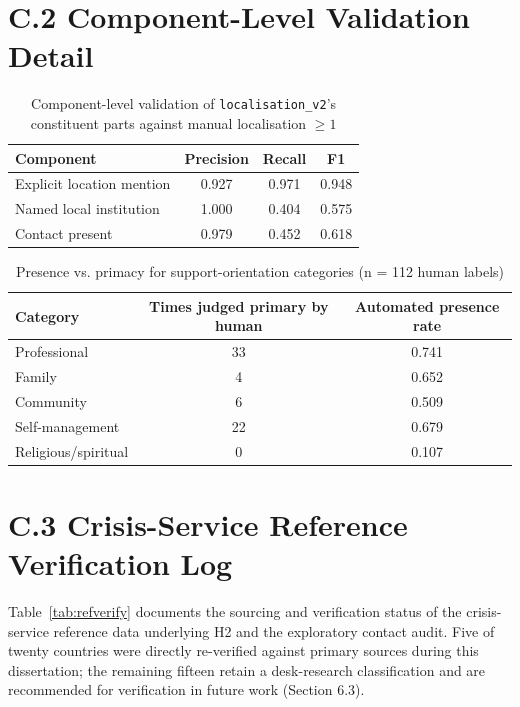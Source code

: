 \section*{C.2 Component-Level Validation Detail}

\begin{table}[H]
\centering
\caption{Component-level validation of \texttt{localisation\_v2}'s constituent parts against manual localisation $\geq 1$}
\begin{tabular}{lccc}
\toprule
Component & Precision & Recall & F1 \\
\midrule
Explicit location mention & 0.927 & 0.971 & 0.948 \\
Named local institution & 1.000 & 0.404 & 0.575 \\
Contact present & 0.979 & 0.452 & 0.618 \\
\bottomrule
\end{tabular}
\end{table}

\begin{table}[H]
\centering
\caption{Presence vs. primacy for support-orientation categories (n = 112 human labels)}
\begin{tabular}{lcc}
\toprule
Category & Times judged primary by human & Automated presence rate \\
\midrule
Professional & 33 & 0.741 \\
Family & 4 & 0.652 \\
Community & 6 & 0.509 \\
Self-management & 22 & 0.679 \\
Religious/spiritual & 0 & 0.107 \\
\bottomrule
\end{tabular}
\end{table}

\section*{C.3 Crisis-Service Reference Verification Log}

Table~\ref{tab:refverify} documents the sourcing and verification status of the crisis-service reference data underlying H2 and the exploratory contact audit. Five of twenty countries were directly re-verified against primary sources during this dissertation; the remaining fifteen retain a desk-research classification and are recommended for verification in future work (Section 6.3).

